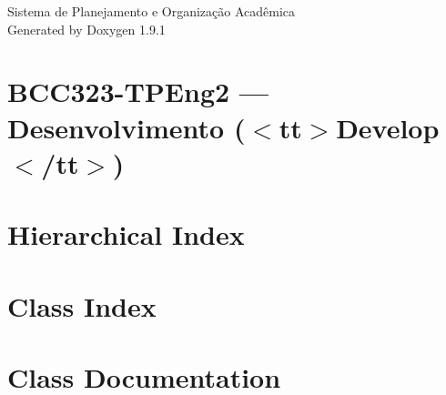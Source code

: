 \let\mypdfximage\pdfximage\def\pdfximage{\immediate\mypdfximage}\documentclass[twoside]{book}
\newcommand{\+}{\discretionary{\mbox{\scriptsize$\hookleftarrow$}}{}{}}
\newcommand{\clearemptydoublepage}{%
  \newpage{\pagestyle{empty}\cleardoublepage}%
}
\begin{document}
\raggedbottom

\hypersetup{pageanchor=false,
             bookmarksnumbered=true,
             pdfencoding=unicode
            }
\begin{titlepage}
\vspace*{7cm}
\begin{center}%
{\Large Sistema de Planejamento e Organização Acadêmica }\\
\vspace*{1cm}
{\large Generated by Doxygen 1.9.1}\\
\end{center}
\end{titlepage}
\clearemptydoublepage
{}
\tableofcontents
\clearemptydoublepage
{}
\hypersetup{pageanchor=true}

\chapter{BCC323-\/\+TPEng2 — Desenvolvimento ($<$tt$>$Develop$<$/tt$>$)}
\label{index}\hypertarget{index}{}
\chapter{Hierarchical Index}

\chapter{Class Index}

\chapter{Class Documentation}










\backmatter
\newpage
{}
\clearemptydoublepage
{}
\printindex
\end{document}

